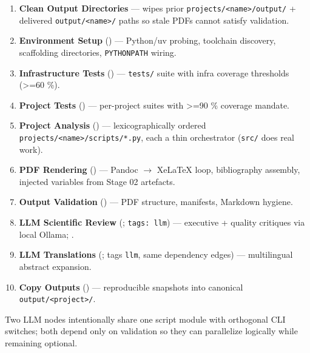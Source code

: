 \documentclass[
]{article}
\providecommand{\tightlist}{%
  \setlength{\itemsep}{0pt}\setlength{\parskip}{0pt}}
\begin{document}
\begin{enumerate}
\def\labelenumi{\arabic{enumi}.}
\tightlist
\item
  \textbf{Clean Output Directories} --- wipes prior
  \texttt{projects/\textless{}name\textgreater{}/output/} + delivered
  \texttt{output/\textless{}name\textgreater{}/} paths so stale PDFs
  cannot satisfy validation.
\item
  \textbf{Environment Setup} () ---
  Python/uv probing, toolchain discovery, scaffolding directories,
  \texttt{PYTHONPATH} wiring.
\item
  \textbf{Infrastructure Tests}
  () --- \texttt{tests/} suite
  with infra coverage thresholds (\texorpdfstring{\textgreater{}=}{>=}60 \%).
\item
  \textbf{Project Tests} ()
  --- per-project suites with \texorpdfstring{\textgreater{}=}{>=}90 \% coverage mandate.
\item
  \textbf{Project Analysis} () ---
  lexicographically ordered
  \texttt{projects/\textless{}name\textgreater{}/scripts/*.py}, each a
  thin orchestrator (\texttt{src/} does real work).
\item
  \textbf{PDF Rendering} () --- Pandoc \texorpdfstring{\ensuremath{\to}}{->}
  XeLaTeX loop, bibliography assembly, injected variables from Stage 02
  artefacts.
\item
  \textbf{Output Validation} () --- PDF
  structure, manifests, Markdown hygiene.
\item
  \textbf{LLM Scientific Review}
  (; \texttt{tags:\ llm})
  --- executive + quality critiques via local Ollama;
  .
\item
  \textbf{LLM Translations}
  (; tags
  \texttt{llm}, same dependency edges) --- multilingual abstract
  expansion.
\item
  \textbf{Copy Outputs} () --- reproducible
  snapshots into canonical
  \texttt{output/\textless{}project\textgreater{}/}.
\end{enumerate}

Two LLM nodes intentionally share one script module with orthogonal CLI
switches; both depend only on validation so they can parallelize
logically while remaining optional.
\end{document}
